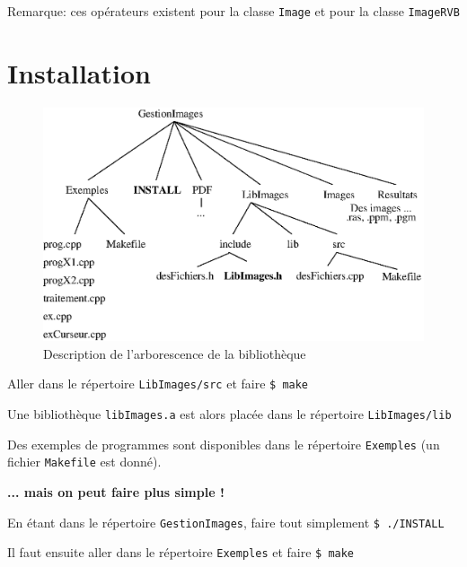 \documentclass[12pt]{article}
\begin{document}
Remarque: ces op\'erateurs existent pour la classe {\tt Image}
et pour la classe {\tt ImageRVB}

\section{Installation}

\begin{figure}[hbtp]
\begin{center}
\includegraphics[width=13.5cm]{fig/arbo}
\caption{Description de l'arborescence de la biblioth\`eque}
\end{center}
\end{figure}

Aller dans le r\'epertoire {\tt LibImages/src}
et faire {\tt \$ make}

Une biblioth\`eque {\tt libImages.a} est alors plac\'ee dans le r\'epertoire
{\tt LibImages/lib}

Des exemples de programmes sont disponibles dans le r\'epertoire
{\tt Exemples} (un fichier {\tt Makefile} est donn\'e). 

\vspace{0.5cm}
{\bf ... mais on peut faire plus simple !}

\vspace{0.3cm}

En \'etant dans le r\'epertoire {\tt GestionImages}, faire tout
simplement {\tt \$ ./INSTALL}

Il faut ensuite aller dans le r\'epertoire {\tt Exemples}
et faire {\tt \$ make}
\end{document}
